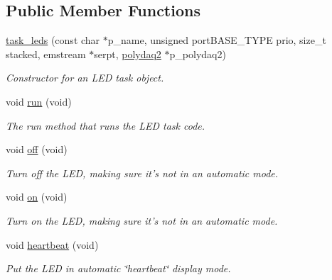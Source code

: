 \subsection*{Public Member Functions}
\begin{DoxyCompactItemize}
\item 
\hyperlink{classtask__leds_a2668a7e5a5caf01d35aac71931c32144}{task\-\_\-leds} (const char $\ast$p\-\_\-name, unsigned port\-B\-A\-S\-E\-\_\-\-T\-Y\-P\-E prio, size\-\_\-t stacked, emstream $\ast$serpt, \hyperlink{classpolydaq2}{polydaq2} $\ast$p\-\_\-polydaq2)
\begin{DoxyCompactList}\small\item\em Constructor for an L\-E\-D task object. \end{DoxyCompactList}\item 
void \hyperlink{classtask__leds_a1313d40cbf49463320c6550a68dd99fa}{run} (void)
\begin{DoxyCompactList}\small\item\em The run method that runs the L\-E\-D task code. \end{DoxyCompactList}\item 
\hypertarget{classtask__leds_a31aba898d3c8fdae205d2461c949bf9d}{void \hyperlink{classtask__leds_a31aba898d3c8fdae205d2461c949bf9d}{off} (void)}\label{classtask__leds_a31aba898d3c8fdae205d2461c949bf9d}

\begin{DoxyCompactList}\small\item\em Turn off the L\-E\-D, making sure it's not in an automatic mode. \end{DoxyCompactList}\item 
\hypertarget{classtask__leds_a8debcc8582a950b9f184135c949625e7}{void \hyperlink{classtask__leds_a8debcc8582a950b9f184135c949625e7}{on} (void)}\label{classtask__leds_a8debcc8582a950b9f184135c949625e7}

\begin{DoxyCompactList}\small\item\em Turn on the L\-E\-D, making sure it's not in an automatic mode. \end{DoxyCompactList}\item 
\hypertarget{classtask__leds_a4c88fa3b0821e4071c653fc22d1b75e3}{void \hyperlink{classtask__leds_a4c88fa3b0821e4071c653fc22d1b75e3}{heartbeat} (void)}\label{classtask__leds_a4c88fa3b0821e4071c653fc22d1b75e3}

\begin{DoxyCompactList}\small\item\em Put the L\-E\-D in automatic \char`\"{}heartbeat\char`\"{} display mode. \end{DoxyCompactList}\end{DoxyCompactItemize}
